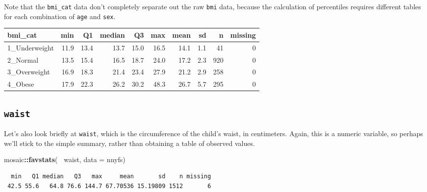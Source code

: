 \documentclass[
]{book}
\newenvironment{Shaded}{\begin{snugshade}}{\end{snugshade}}
\newcommand{\DataTypeTok}[1]{\textcolor[rgb]{0.13,0.29,0.53}{#1}}
\newcommand{\DecValTok}[1]{\textcolor[rgb]{0.00,0.00,0.81}{#1}}
\newcommand{\KeywordTok}[1]{\textcolor[rgb]{0.13,0.29,0.53}{\textbf{#1}}}
\newcommand{\NormalTok}[1]{#1}
\newcommand{\OperatorTok}[1]{\textcolor[rgb]{0.81,0.36,0.00}{\textbf{#1}}}
\newcommand{\StringTok}[1]{\textcolor[rgb]{0.31,0.60,0.02}{#1}}
\begin{document}
Note that the \texttt{bmi\_cat} data don't completely separate out the raw \texttt{bmi} data, because the calculation of percentiles requires different tables for each combination of \texttt{age} and \texttt{sex}.

\begin{Shaded}
\end{Shaded}

\begin{tabular}{l|r|r|r|r|r|r|r|r|r}
\hline
bmi\_cat & min & Q1 & median & Q3 & max & mean & sd & n & missing\\
\hline
1\_Underweight & 11.9 & 13.4 & 13.7 & 15.0 & 16.5 & 14.1 & 1.1 & 41 & 0\\
\hline
2\_Normal & 13.5 & 15.4 & 16.5 & 18.7 & 24.0 & 17.2 & 2.3 & 920 & 0\\
\hline
3\_Overweight & 16.9 & 18.3 & 21.4 & 23.4 & 27.9 & 21.2 & 2.9 & 258 & 0\\
\hline
4\_Obese & 17.9 & 22.3 & 26.2 & 30.2 & 48.3 & 26.7 & 5.7 & 295 & 0\\
\hline
\end{tabular}

\hypertarget{waist}{%
\subsection{\texorpdfstring{\texttt{waist}}{waist}}\label{waist}}

Let's also look briefly at \texttt{waist}, which is the circumference of the child's waist, in centimeters. Again, this is a numeric variable, so perhaps we'll stick to the simple summary, rather than obtaining a table of observed values.

\begin{Shaded}
\begin{Highlighting}[]
\NormalTok{mosaic}\OperatorTok{::}\KeywordTok{favstats}\NormalTok{(}\OperatorTok{~}\StringTok{ }\NormalTok{waist, }\DataTypeTok{data =}\NormalTok{ nnyfs) }
\end{Highlighting}
\end{Shaded}

\begin{verbatim}
  min   Q1 median   Q3   max     mean       sd    n missing
 42.5 55.6   64.8 76.6 144.7 67.70536 15.19809 1512       6
\end{verbatim}
\end{document}
